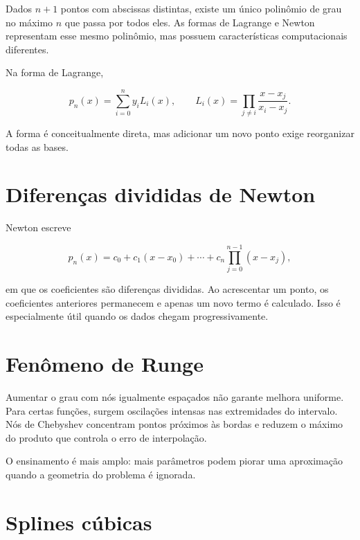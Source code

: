 \documentclass[12pt,a4paper,openany]{book}
\begin{document}
Dados $n+1$ pontos com abscissas distintas, existe um único polinômio de grau no máximo $n$ que passa por todos eles. As formas de Lagrange e Newton representam esse mesmo polinômio, mas possuem características computacionais diferentes.



Na forma de Lagrange,



\[p_n(x)=\sum_{i=0}^{n} y_i L_i(x),\qquad L_i(x)=\prod_{j\ne i}\frac{x-x_j}{x_i-x_j}.\]



A forma é conceitualmente direta, mas adicionar um novo ponto exige reorganizar todas as bases.



\section{Diferenças divididas de Newton}



Newton escreve



\[p_n(x)=c_0+c_1(x-x_0)+\cdots+c_n\prod_{j=0}^{n-1}(x-x_j),\]



em que os coeficientes são diferenças divididas. Ao acrescentar um ponto, os coeficientes anteriores permanecem e apenas um novo termo é calculado. Isso é especialmente útil quando os dados chegam progressivamente.



\section{Fenômeno de Runge}



Aumentar o grau com nós igualmente espaçados não garante melhora uniforme. Para certas funções, surgem oscilações intensas nas extremidades do intervalo. Nós de Chebyshev concentram pontos próximos às bordas e reduzem o máximo do produto que controla o erro de interpolação.



O ensinamento é mais amplo: mais parâmetros podem piorar uma aproximação quando a geometria do problema é ignorada.



\section{Splines cúbicas}
\end{document}
